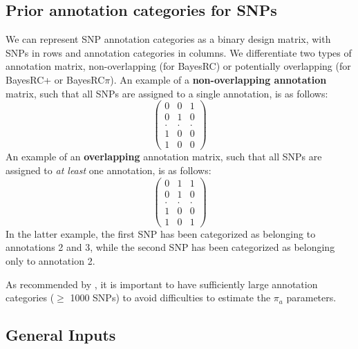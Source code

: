 \documentclass{ol-softwaremanual}
\begin{document}
\subsection{Prior annotation categories for SNPs}

We can represent SNP annotation categories as a binary design matrix, with SNPs in rows and annotation categories in columns. We differentiate two types of annotation matrix, non-overlapping (for BayesRC) or potentially overlapping (for BayesRC+ or BayesRC$\pi$). An example of a \textbf{non-overlapping annotation} matrix, such that all SNPs are assigned to a single annotation, is as follows:
\[\begin{pmatrix}
0 & 0 & 1\\
0 & 1 & 0\\
. & . & . \\
1 & 0 & 0 \\
1 & 0 & 0
\end{pmatrix}\]
An example of an \textbf{overlapping} annotation matrix, such that all SNPs are assigned to {\it at least} one annotation, is as follows: 
\[\begin{pmatrix}
0 & 1 & 1\\
0 & 1 & 0\\
. & . & . \\
1 & 0 & 0 \\
1 & 0 & 1
\end{pmatrix}\]
In the latter example, the first SNP has been categorized as belonging to annotations 2 and 3, while the second SNP has been categorized as belonging only to annotation 2.

As recommended by \citet{macleod_exploiting_2016}, it is important to have sufficiently large annotation categories ($\geq$ 1000 SNPs) to avoid difficulties to estimate the $\pi_a$ parameters.

\clearpage
\subsection{General Inputs}
\end{document}

